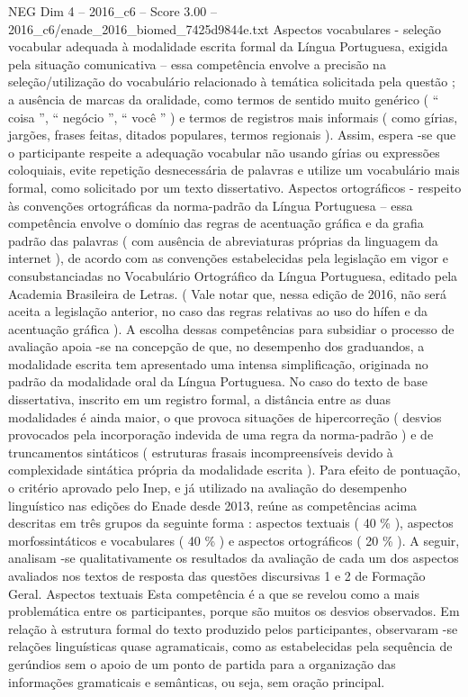 \begin{textsample}{NEG Dim 4 – 2016\_c6 – Score 3.00 – 2016\_c6/enade\_2016\_biomed\_7425d9844e.txt}
Aspectos vocabulares - seleção vocabular adequada à modalidade escrita formal da Língua Portuguesa, exigida pela situação comunicativa – essa competência envolve a precisão na seleção/utilização do vocabulário relacionado à temática solicitada pela questão ; a ausência de marcas da oralidade, como termos de sentido muito genérico ( “ coisa ”, “ negócio ”, “ você ” ) e termos de registros mais informais ( como gírias, jargões, frases feitas, ditados populares, termos regionais ).
Assim, espera -se que o participante respeite a adequação vocabular não usando gírias ou expressões coloquiais, evite repetição desnecessária de palavras e utilize um vocabulário mais formal, como solicitado por um texto dissertativo.
Aspectos ortográficos - respeito às convenções ortográficas da norma-padrão da Língua Portuguesa – essa competência envolve o domínio das regras de acentuação gráfica e da grafia padrão das palavras ( com ausência de abreviaturas próprias da linguagem da internet ), de acordo com as convenções estabelecidas pela legislação em vigor e consubstanciadas no Vocabulário Ortográfico da Língua Portuguesa, editado pela Academia Brasileira de Letras. ( Vale notar que, nessa edição de 2016, não será aceita a legislação anterior, no caso das regras relativas ao uso do hífen e da acentuação gráfica ).
A escolha dessas competências para subsidiar o processo de avaliação apoia -se na concepção de que, no desempenho dos graduandos, a modalidade escrita tem apresentado uma intensa simplificação, originada no padrão da modalidade oral da Língua Portuguesa.
No caso do texto de base dissertativa, inscrito em um registro formal, a distância entre as duas modalidades é ainda maior, o que provoca situações de hipercorreção ( desvios provocados pela incorporação indevida de uma regra da norma-padrão ) e de truncamentos sintáticos ( estruturas frasais incompreensíveis devido à complexidade sintática própria da modalidade escrita ).
Para efeito de pontuação, o critério aprovado pelo Inep, e já utilizado na avaliação do desempenho linguístico nas edições do Enade desde 2013, reúne as competências acima descritas em três grupos da seguinte forma : aspectos textuais ( 40 \% ), aspectos morfossintáticos e vocabulares ( 40 \% ) e aspectos ortográficos ( 20 \% ).
A seguir, analisam -se qualitativamente os resultados da avaliação de cada um dos aspectos avaliados nos textos de resposta das questões discursivas 1 e 2 de Formação Geral.
Aspectos textuais Esta competência é a que se revelou como a mais problemática entre os participantes, porque são muitos os desvios observados.
Em relação à estrutura formal do texto produzido pelos participantes, observaram -se relações linguísticas quase agramaticais, como as estabelecidas pela sequência de gerúndios sem o apoio de um ponto de partida para a organização das informações gramaticais e semânticas, ou seja, sem oração principal.

\end{textsample}
